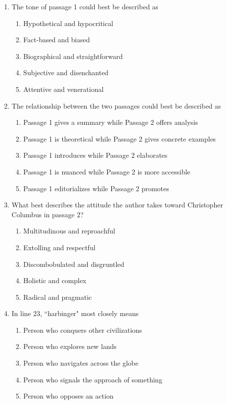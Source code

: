 \newpage
\begin{enumerate}
\item The tone of passage 1 could best be described as
\begin{enumerate}[label=(\Alph*)]
\item Hypothetical and hypocritical
\item Fact-based and biased
\item Biographical and straightforward
\item Subjective and disenchanted
\item Attentive and venerational
\end{enumerate}

\bigskip
\item The relationship between the two passages could best be described as
\begin{enumerate}[label=(\Alph*)]
\item Passage 1 gives a summary while Passage 2 offers analysis
\item Passage 1 is theoretical while Passage 2 gives concrete examples
\item Passage 1 introduces while Passage 2 elaborates
\item Passage 1 is nuanced while Passage 2 is more accessible
\item Passage 1 editorializes while Passage 2 promotes
\end {enumerate}

\bigskip
\item What best describes the attitude the author takes toward Christopher Columbus in passage 2?
\begin{enumerate}[label=(\Alph*)]
\item Multitudinous and reproachful
\item Extolling and respectful
\item Discombobulated and disgruntled
\item Holistic and complex
\item Radical and pragmatic
\end{enumerate}


\bigskip
\item In line 23, ``harbinger" most closely means
\begin{enumerate}[label=(\Alph*)]
\item Person who conquers other civilizations
\item Person who explores new lands
\item Person who navigates across the globe
\item Person who signals the approach of something
\item Person who opposes an action
\end{enumerate}


\end{enumerate}
